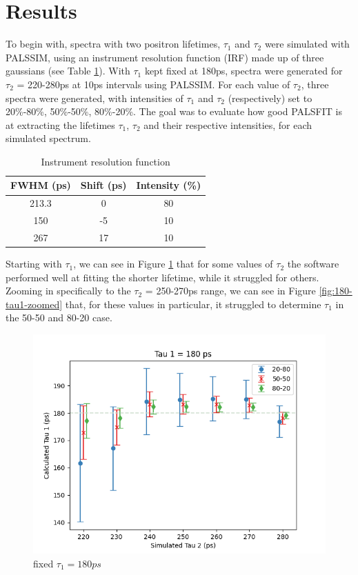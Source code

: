 \chapter*{Results}

To begin with, spectra with two positron lifetimes, $\tau_1$ and $\tau_2$ were simulated with PALSSIM, using an instrument resolution function (IRF) made up of three gaussians (see Table \ref{tab:irf}). With $\tau_1$ kept fixed at 180ps, spectra were generated for $\tau_2$  = 220-280ps at 10ps intervals using PALSSIM. For each value of $\tau_2$, three spectra were generated, with intensities of $\tau_1$ and $\tau_2$ (respectively) set to 20\%-80\%, 50\%-50\%, 80\%-20\%. The goal was to evaluate how good PALSFIT is at extracting the lifetimes $\tau_1$, $\tau_2$ and their respective intensities, for each simulated spectrum. 

\begin{table}[h]
    \centering
    \begin{tabular}{|c|c|c|}
        \hline
        FWHM (ps) &  Shift (ps) & Intensity (\%) \\
        \hline
        213.3 & 0 & 80\\ 
        150 & -5 & 10\\ 
        267 & 17 & 10\\  
        \hline
    \end{tabular}
    \caption{Instrument resolution function}
    \label{tab:irf}
\end{table}

Starting with $\tau_1$, we can see in Figure \ref{fig:180-tau1} that for some values of $\tau_2$ the software performed well at fitting the shorter lifetime, while it struggled for others. 
Zooming in specifically to the $\tau_2$ = 250-270ps range, we can see in Figure \ref{fig:180-tau1-zoomed} that, for these values in particular, it struggled to determine $\tau_1$ in the 50-50 and 80-20 case. 

\begin{figure}
    \centering
    \includegraphics[width=0.8\linewidth]{Batch 1+2/Tau1.png}
    \caption{fixed $\tau_1 = 180ps$}
    \label{fig:180-tau1}
\end{figure}

